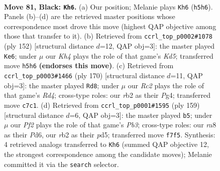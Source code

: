 \documentclass[11pt]{article}
\begin{document}
\clearpage

\begin{figure}[p]\centering
\begin{subfigure}{0.46\textwidth}\centering
\resizebox{\linewidth}{!}{%
\newchessgame
\chessboard[
  setfen={R7/2r2p2/4p3/7k/P3P3/5P1K/1R6/8 b - - 54 81},
  showmover=false,
  pgfstyle=straightmove, color=movearrow, markmove={h5-h6}
]}
\caption{}
\end{subfigure}\hfill
\begin{subfigure}{0.46\textwidth}\centering
\resizebox{\linewidth}{!}{%
\newchessgame
\chessboard[
  setfen={8/1k6/8/3K3p/r5pP/2R3P1/8/8 w - - 0 77},
  showmover=false,
  pgfstyle=straightmove, color=movearrow, markmove={d5-e6}
]}
\caption{}
\end{subfigure}
\\[4pt]
\begin{subfigure}{0.46\textwidth}\centering
\resizebox{\linewidth}{!}{%
\newchessgame
\chessboard[
  setfen={8/5pk1/4p3/4P3/3R1PP1/8/6K1/2r5 w - - 87 86},
  showmover=false,
  pgfstyle=straightmove, color=movearrow, markmove={d4-d8}
]}
\caption{}
\end{subfigure}\hfill
\begin{subfigure}{0.46\textwidth}\centering
\resizebox{\linewidth}{!}{%
\newchessgame
\chessboard[
  setfen={8/6k1/1p1p4/p2P3K/P3PR2/1r6/8/8 b - - 0 80},
  showmover=false,
  pgfstyle=straightmove, color=movearrow, markmove={b6-b5}
]}
\caption{}
\end{subfigure}
\caption{\textbf{Move 81, Black: \texttt{Kh6}.} (a) Our position; Melanie plays \texttt{Kh6} (\texttt{h5h6}). Panels (b)--(d) are the retrieved master positions whose correspondence most drove this move (highest QAP objective among those that transfer to it). (b) Retrieved from \texttt{ccrl\_top\_p0002\#1078} (ply 152) [structural distance $d$=12, QAP obj=3]: the master played \texttt{Ke6}; under $\mu$ our \emph{Kh4} plays the role of that game's \emph{Kd5}; transferred move \texttt{h5h6} \textbf{(endorses this move)}. (c) Retrieved from \texttt{ccrl\_top\_p0003\#1466} (ply 170) [structural distance $d$=11, QAP obj=3]: the master played \texttt{Rd8}; under $\mu$ our \emph{Rc2} plays the role of that game's \emph{Rd4}; cross-type roles: our \emph{r}b2 as their \emph{P}g4; transferred move \texttt{c7c1}. (d) Retrieved from \texttt{ccrl\_top\_p0001\#1595} (ply 159) [structural distance $d$=6, QAP obj=3]: the master played \texttt{b5}; under $\mu$ our \emph{Pf2} plays the role of that game's \emph{Pb3}; cross-type roles: our \emph{r}a8 as their \emph{P}d6, our \emph{r}b2 as their \emph{p}d5; transferred move \texttt{f7f5}. Synthesis: 4 retrieved analogs transferred to \texttt{Kh6} (summed QAP objective 12, the strongest correspondence among the candidate moves); Melanie committed it via the \texttt{search} selector.}
\label{fig:thought-m161}
\end{figure}
\end{document}
